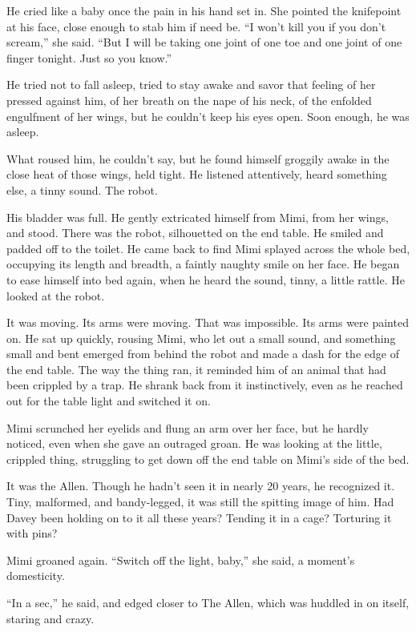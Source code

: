 \documentclass{article}
\begin{document}
He cried like a baby once the pain in his hand set in.  She pointed
the knifepoint at his face, close enough to stab him if need be.  ``I
won't kill you if you don't scream,'' she said.  ``But I will be
taking one joint of one toe and one joint of one finger tonight.  Just
so you know.''

He tried not to fall asleep, tried to stay awake and savor that
feeling of her pressed against him, of her breath on the nape of his
neck, of the enfolded engulfment of her wings, but he couldn't keep
his eyes open.  Soon enough, he was asleep.

What roused him, he couldn't say, but he found himself groggily awake
in the close heat of those wings, held tight.  He listened
attentively, heard something else, a tinny sound.  The robot.

His bladder was full.  He gently extricated himself from Mimi, from
her wings, and stood.  There was the robot, silhouetted on the end
table.  He smiled and padded off to the toilet.  He came back to find
Mimi splayed across the whole bed, occupying its length and breadth, a
faintly naughty smile on her face.  He began to ease himself into bed
again, when he heard the sound, tinny, a little rattle.  He looked at
the robot.

It was moving.  Its arms were moving.  That was impossible.  Its arms
were painted on.  He sat up quickly, rousing Mimi, who let out a small
sound, and something small and bent emerged from behind the robot and
made a dash for the edge of the end table.  The way the thing ran, it
reminded him of an animal that had been crippled by a trap.  He shrank
back from it instinctively, even as he reached out for the table light
and switched it on.

Mimi scrunched her eyelids and flung an arm over her face, but he
hardly noticed, even when she gave an outraged groan.  He was looking
at the little, crippled thing, struggling to get down off the end
table on Mimi's side of the bed.

It was the Allen.  Though he hadn't seen it in nearly 20 years, he
recognized it.  Tiny, malformed, and bandy-legged, it was still the
spitting image of him.  Had Davey been holding on to it all these
years?  Tending it in a cage?  Torturing it with pins?

Mimi groaned again.  ``Switch off the light, baby,'' she said, a
moment's domesticity.

``In a sec,'' he said, and edged closer to The Allen, which was
huddled in on itself, staring and crazy.
\end{document}

